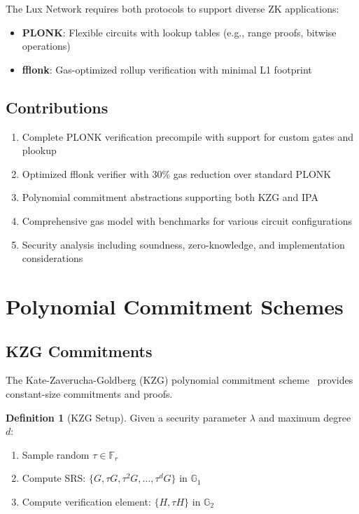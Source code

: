 \documentclass[11pt,a4paper]{article}
\theoremstyle{definition}
\newtheorem{definition}{Definition}
\begin{document}
The Lux Network requires both protocols to support diverse ZK applications:
\begin{itemize}
    \item \textbf{PLONK}: Flexible circuits with lookup tables (e.g., range proofs, bitwise operations)
    \item \textbf{fflonk}: Gas-optimized rollup verification with minimal L1 footprint
\end{itemize}

\subsection{Contributions}

\begin{enumerate}
    \item Complete PLONK verification precompile with support for custom gates and plookup
    \item Optimized fflonk verifier with 30\% gas reduction over standard PLONK
    \item Polynomial commitment abstractions supporting both KZG and IPA
    \item Comprehensive gas model with benchmarks for various circuit configurations
    \item Security analysis including soundness, zero-knowledge, and implementation considerations
\end{enumerate}

\section{Polynomial Commitment Schemes}

\subsection{KZG Commitments}

The Kate-Zaverucha-Goldberg (KZG) polynomial commitment scheme~\cite{kzg} provides constant-size commitments and proofs.

\begin{definition}[KZG Setup]
    Given a security parameter $\lambda$ and maximum degree $d$:
    \begin{enumerate}
        \item Sample random $\tau \in \mathbb{F}_r$
        \item Compute SRS: $\{G, \tau G, \tau^2 G, \ldots, \tau^d G\}$ in $\mathbb{G}_1$
        \item Compute verification element: $\{H, \tau H\}$ in $\mathbb{G}_2$
    \end{enumerate}
\end{definition}
\end{document}
